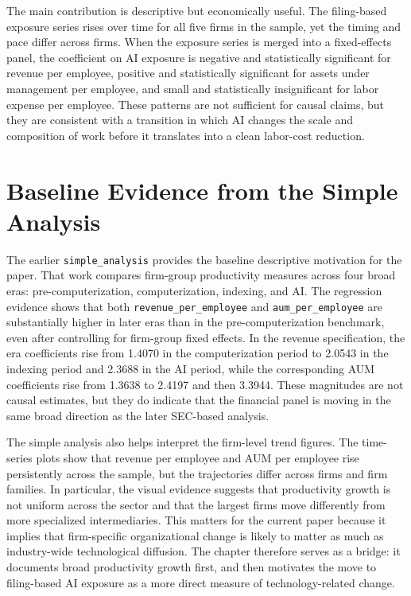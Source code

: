 \documentclass[11pt]{article}
\begin{document}
The main contribution is descriptive but economically useful. The filing-based exposure series rises over time for all five firms in the sample, yet the timing and pace differ across firms. When the exposure series is merged into a fixed-effects panel, the coefficient on AI exposure is negative and statistically significant for revenue per employee, positive and statistically significant for assets under management per employee, and small and statistically insignificant for labor expense per employee. These patterns are not sufficient for causal claims, but they are consistent with a transition in which AI changes the scale and composition of work before it translates into a clean labor-cost reduction.

\section{Baseline Evidence from the Simple Analysis}
The earlier \texttt{simple\_analysis} provides the baseline descriptive motivation for the paper. That work compares firm-group productivity measures across four broad eras: pre-computerization, computerization, indexing, and AI. The regression evidence shows that both \texttt{revenue\_per\_employee} and \texttt{aum\_per\_employee} are substantially higher in later eras than in the pre-computerization benchmark, even after controlling for firm-group fixed effects. In the revenue specification, the era coefficients rise from 1.4070 in the computerization period to 2.0543 in the indexing period and 2.3688 in the AI period, while the corresponding AUM coefficients rise from 1.3638 to 2.4197 and then 3.3944. These magnitudes are not causal estimates, but they do indicate that the financial panel is moving in the same broad direction as the later SEC-based analysis.

The simple analysis also helps interpret the firm-level trend figures. The time-series plots show that revenue per employee and AUM per employee rise persistently across the sample, but the trajectories differ across firms and firm families. In particular, the visual evidence suggests that productivity growth is not uniform across the sector and that the largest firms move differently from more specialized intermediaries. This matters for the current paper because it implies that firm-specific organizational change is likely to matter as much as industry-wide technological diffusion. The chapter therefore serves as a bridge: it documents broad productivity growth first, and then motivates the move to filing-based AI exposure as a more direct measure of technology-related change.
\end{document}
